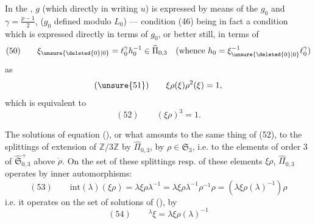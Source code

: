 

\uline{} In the ,  $g$  (which  directly in writing $u$) is expressed by means of the $g_0$  and $\gamma=\frac{p-1}{2}$,  ($g_0$ defined modulo $L_0$) --- condition (46) being in fact a condition which is expressed directly in terms of $g_0$, or better still, in terms of
\[
(50)\qquad
\xi_{\unsure{\deleted{0}|0}}=\ell_0^\gamma h_0^{-1}\in\widehat{\Pi}_{0,3}
\quad\text{(whence }h_0=\xi_{\unsure{\deleted{0}|0}}^{-1}\ell_0^\gamma\text{)}
\]
as
\[
(\unsure{51})\qquad \xi\rho(\xi)\rho^2(\xi)=1,
\]
which is equivalent to
\[
(52)\qquad (\xi\rho)^3=1.
\]

The solutions of equation (), or what amounts to the same thing of (52),  to the splittings of  extension  of $\mathbb Z/3\mathbb Z$ by $\widehat{\Pi}_{0,3}$,  by $\rho\in\mathfrak S_3$,  i.e. to the elements of order 3 of $\widehat{\mathfrak S}_{0,3}^{+}$ above $\dot\rho$.
On the set of these splittings resp. of these elements $\xi\rho$, $\widehat{\Pi}_{0,3}$ operates by inner automorphisms:
\[
(53)\qquad
\mathrm{int}(\lambda)(\xi\rho)
=\lambda\xi\rho\lambda^{-1}
=\lambda\xi\rho\lambda^{-1}\rho^{-1}\rho
=(\lambda\xi\rho(\lambda)^{-1})\rho
\]
i.e. it operates on the set of solutions of (), by
\[
(54)\qquad {}^\lambda\xi=\lambda\xi\rho(\lambda)^{-1}
\]

